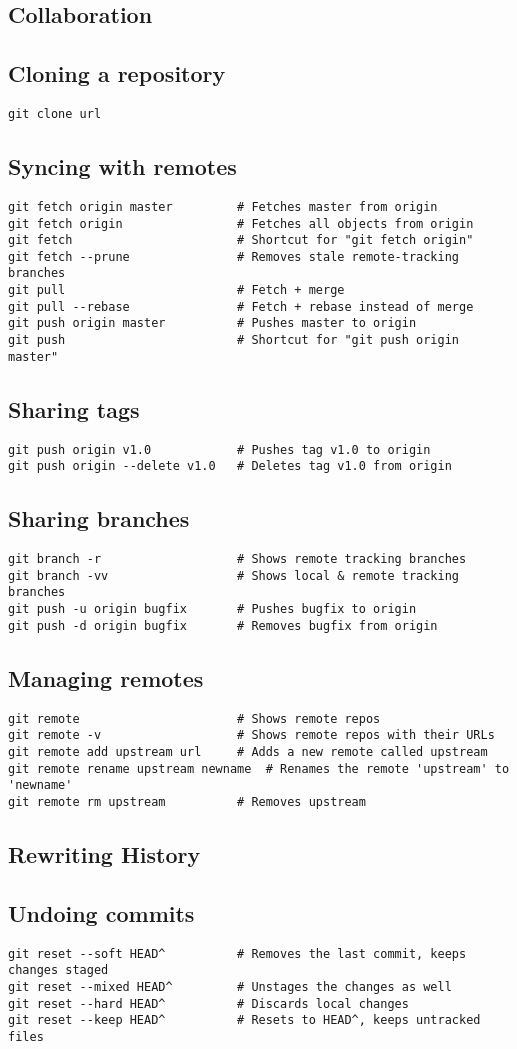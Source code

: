 \documentclass[a4paper,10pt]{article}
\newcommand{\sectiontitle}[1]{%
    \begin{center}
        \section*{#1}
    \end{center}
    \vspace{-0.5em}
}
\newcommand{\subsectiontitle}[1]{\subsection*{#1}\vspace{-0.3em}}
\begin{document}
\newpage

\sectiontitle{Collaboration}
\subsectiontitle{Cloning a repository}
\begin{verbatim}
git clone url
\end{verbatim}

\subsectiontitle{Syncing with remotes}
\begin{verbatim}
git fetch origin master         # Fetches master from origin
git fetch origin                # Fetches all objects from origin
git fetch                       # Shortcut for "git fetch origin"
git fetch --prune               # Removes stale remote-tracking branches
git pull                        # Fetch + merge
git pull --rebase               # Fetch + rebase instead of merge
git push origin master          # Pushes master to origin
git push                        # Shortcut for "git push origin master"
\end{verbatim}

\subsectiontitle{Sharing tags}
\begin{verbatim}
git push origin v1.0            # Pushes tag v1.0 to origin
git push origin --delete v1.0   # Deletes tag v1.0 from origin
\end{verbatim}

\subsectiontitle{Sharing branches}
\begin{verbatim}
git branch -r                   # Shows remote tracking branches
git branch -vv                  # Shows local & remote tracking branches
git push -u origin bugfix       # Pushes bugfix to origin
git push -d origin bugfix       # Removes bugfix from origin
\end{verbatim}

\subsectiontitle{Managing remotes}
\begin{verbatim}
git remote                      # Shows remote repos
git remote -v                   # Shows remote repos with their URLs
git remote add upstream url     # Adds a new remote called upstream
git remote rename upstream newname  # Renames the remote 'upstream' to 'newname'
git remote rm upstream          # Removes upstream
\end{verbatim}
\newpage

\sectiontitle{Rewriting History}
\subsectiontitle{Undoing commits}
\begin{verbatim}
git reset --soft HEAD^          # Removes the last commit, keeps changes staged
git reset --mixed HEAD^         # Unstages the changes as well
git reset --hard HEAD^          # Discards local changes
git reset --keep HEAD^          # Resets to HEAD^, keeps untracked files
\end{verbatim}
\end{document}
